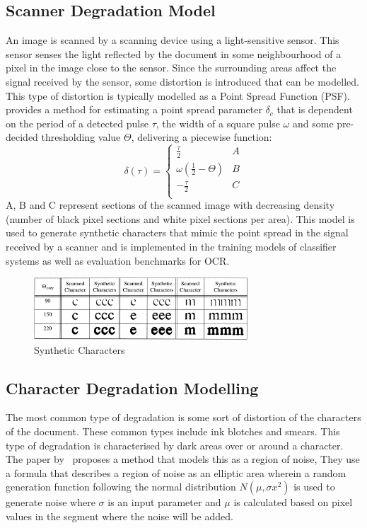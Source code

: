 \documentclass[a4paper, 12pt]{report}
\begin{document}
\subsection{Scanner Degradation Model}

An image is scanned by a scanning device using a light-sensitive sensor. This
sensor senses the light reflected by the document in some neighbourhood of a
pixel in the image close to the sensor. Since the surrounding areas affect the
signal received by the sensor, some distortion is introduced that can be
modelled. This type of distortion is typically modelled as a Point Spread
Function (PSF).~\cite{smith1998characterization} provides a method for
estimating a point spread parameter \(\delta_c\) that is dependent on the
period of a detected pulse \(\tau\), the width of a square pulse \(\omega\) and
some pre-decided thresholding value \(\Theta\), delivering a piecewise
function:
\[
    \delta(\tau)=
    \begin{cases}
        \frac{\tau}{2}             & A \\
        \omega(\frac{1}{2}-\Theta) & B \\
        -\frac{\tau}{2}            & C \\
    \end{cases}
\]
A, B and C represent sections of the scanned image with decreasing density
(number of black pixel sections and white pixel sections per area). This model
is used to generate synthetic characters that mimic the point spread in the
signal received by a scanner and is implemented in the training models of
classifier systems as well as evaluation benchmarks for OCR.

\begin{figure}[ht]
    \centering
    \includegraphics[width=8cm]{scanner.jpg}
    \caption{Synthetic Characters~\cite{smith1998characterization}}
    \label{fig:scanner}
\end{figure}

\subsection{Character Degradation Modelling}
The most common type of degradation is some sort of distortion of the
characters of the document. These common types include ink blotches and smears.
This type of degradation is characterised by dark areas over or around a
character. The paper by~\cite{kieu2012character} proposes a method that models
this as a region of noise, They use a formula that describes a region of noise
as an elliptic area wherein a random generation function following the normal
distribution \(N(\mu,\sigma x^2)\) is used to generate noise where \(\sigma\)
is an input parameter and \(\mu\) is calculated based on pixel values in the
segment where the noise will be added.
\end{document}
